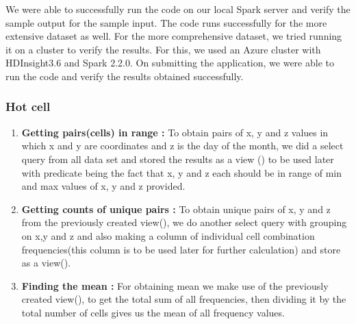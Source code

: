 We were able to successfully run the code on our local Spark server and verify the sample output for the sample input. The code runs successfully for the more extensive dataset as well. For the more comprehensive dataset, we tried running it on a cluster to verify the results. For this, we used an Azure cluster with HDInsight3.6 and Spark 2.2.0. On submitting the application, we were able to run the code and verify the results obtained successfully.

\subsubsection{Hot cell}

\begin{enumerate}
    \item \textbf{Getting pairs(cells) in range :} To obtain pairs of x, y and z values in which x and y are coordinates and z is the day of the month, we did a select query from all data set and stored the results as a view () to be used later  with predicate being the fact that x, y and z each should be in range of min and max values of x, y and z provided.
    
    \item \textbf{Getting counts of unique pairs :} To obtain unique pairs of x, y and z from the previously created view(), we do another select query with grouping on x,y and z and also making a column of individual cell combination frequencies(this column is to be used later for further calculation) and store as a view().
    
    \item \textbf{Finding the mean :} For obtaining mean we make use of the previously created view(), to get the total sum of all frequencies, then dividing it by the total number of cells gives us the mean of all frequency values.
    

\end{enumerate}
